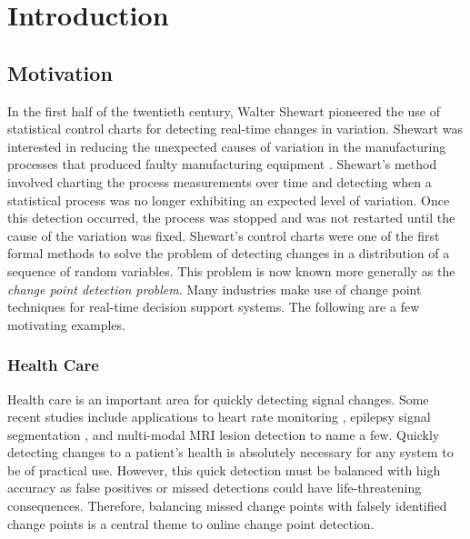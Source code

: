 \chapter{Introduction}
\section{Motivation}
In the first half of the twentieth century, Walter Shewart pioneered the use of statistical control charts for detecting real-time changes in variation.  Shewart was interested in reducing the unexpected causes of variation in the manufacturing processes that produced faulty manufacturing equipment \cite{shewhart1931economic}. Shewart's method involved charting the process measurements over time and detecting when a statistical process was no longer exhibiting an expected level of variation. Once this detection occurred, the process was stopped and was not restarted until the cause of the variation was fixed.
Shewart's control charts were one of the first formal methods to solve the problem of detecting changes in a distribution of a sequence of random variables. This problem is now known more generally as the \textit{change point detection problem}. Many industries make use of change point techniques for real-time decision support systems. The following are a few motivating examples.

\subsection{Health Care}
Health care is an important area for quickly detecting signal changes. Some recent studies include applications to heart rate monitoring \cite{yang2006adaptive} \cite{staudacher2005new}, epilepsy signal segmentation \cite{malladi2013online}, and multi-modal MRI lesion detection \cite{bosc2003automatic} to name a few. Quickly detecting changes to a patient's health is absolutely necessary for any system to be of practical use. However, this quick detection must be balanced with high accuracy as false positives or missed detections could have life-threatening consequences. Therefore, balancing missed change points with  falsely identified change points is a central theme to online change point detection.



